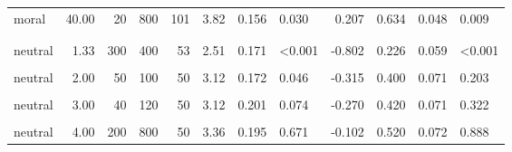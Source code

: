 \documentclass[
]{article}
\begin{document}
\begin{longtable}[t]{lrrrrrrlrrrl}
\hspace{1em}moral & 40.00 & 20 & 800 & 101 & 3.82 & 0.156 & 0.030 & 0.207 & 0.634 & 0.048 & 0.009\\
\addlinespace[0.3em]
\multicolumn{12}{l}{\textbf{Exp. 4}}\\
\hspace{1em}\cellcolor{gray!10}{neutral} & \cellcolor{gray!10}{1.33} & \cellcolor{gray!10}{30} & \cellcolor{gray!10}{40} & \cellcolor{gray!10}{50} & \cellcolor{gray!10}{2.32} & \cellcolor{gray!10}{0.164} & \cellcolor{gray!10}{<0.001} & \cellcolor{gray!10}{-1.025} & \cellcolor{gray!10}{0.160} & \cellcolor{gray!10}{0.053} & \cellcolor{gray!10}{<0.001}\\
\hspace{1em}neutral & 1.33 & 300 & 400 & 53 & 2.51 & 0.171 & <0.001 & -0.802 & 0.226 & 0.059 & <0.001\\
\hspace{1em}\cellcolor{gray!10}{neutral} & \cellcolor{gray!10}{2.00} & \cellcolor{gray!10}{20} & \cellcolor{gray!10}{40} & \cellcolor{gray!10}{53} & \cellcolor{gray!10}{3.00} & \cellcolor{gray!10}{0.194} & \cellcolor{gray!10}{0.024} & \cellcolor{gray!10}{-0.357} & \cellcolor{gray!10}{0.396} & \cellcolor{gray!10}{0.068} & \cellcolor{gray!10}{0.169}\\
\hspace{1em}neutral & 2.00 & 50 & 100 & 50 & 3.12 & 0.172 & 0.046 & -0.315 & 0.400 & 0.071 & 0.203\\
\hspace{1em}\cellcolor{gray!10}{neutral} & \cellcolor{gray!10}{3.00} & \cellcolor{gray!10}{10} & \cellcolor{gray!10}{30} & \cellcolor{gray!10}{53} & \cellcolor{gray!10}{3.17} & \cellcolor{gray!10}{0.207} & \cellcolor{gray!10}{0.151} & \cellcolor{gray!10}{-0.222} & \cellcolor{gray!10}{0.472} & \cellcolor{gray!10}{0.070} & \cellcolor{gray!10}{0.784}\\
\hspace{1em}neutral & 3.00 & 40 & 120 & 50 & 3.12 & 0.201 & 0.074 & -0.270 & 0.420 & 0.071 & 0.322\\
\hspace{1em}\cellcolor{gray!10}{neutral} & \cellcolor{gray!10}{4.00} & \cellcolor{gray!10}{20} & \cellcolor{gray!10}{80} & \cellcolor{gray!10}{52} & \cellcolor{gray!10}{3.54} & \cellcolor{gray!10}{0.224} & \cellcolor{gray!10}{0.832} & \cellcolor{gray!10}{0.024} & \cellcolor{gray!10}{0.558} & \cellcolor{gray!10}{0.070} & \cellcolor{gray!10}{0.488}\\
\hspace{1em}neutral & 4.00 & 200 & 800 & 50 & 3.36 & 0.195 & 0.671 & -0.102 & 0.520 & 0.072 & 0.888\\

\end{longtable}
\end{document}
